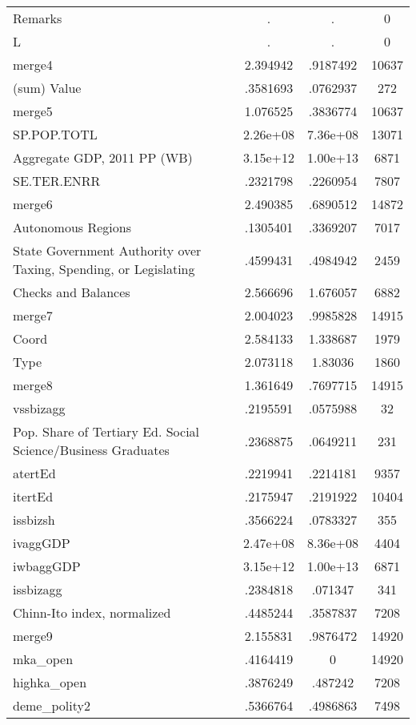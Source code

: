 {\begin{tabular}{l*{1}{ccc}}
Remarks             &           .&           .&           0\\
L                   &           .&           .&           0\\
merge4              &    2.394942&    .9187492&       10637\\
(sum) Value         &    .3581693&    .0762937&         272\\
merge5              &    1.076525&    .3836774&       10637\\
SP.POP.TOTL         &    2.26e+08&    7.36e+08&       13071\\
Aggregate GDP, 2011 PP (WB)&    3.15e+12&    1.00e+13&        6871\\
SE.TER.ENRR         &    .2321798&    .2260954&        7807\\
merge6              &    2.490385&    .6890512&       14872\\
Autonomous Regions  &    .1305401&    .3369207&        7017\\
State Government Authority over Taxing, Spending, or Legislating&    .4599431&    .4984942&        2459\\
Checks and Balances &    2.566696&    1.676057&        6882\\
merge7              &    2.004023&    .9985828&       14915\\
Coord               &    2.584133&    1.338687&        1979\\
Type                &    2.073118&     1.83036&        1860\\
merge8              &    1.361649&    .7697715&       14915\\
vssbizagg           &    .2195591&    .0575988&          32\\
Pop. Share of Tertiary Ed. Social Science/Business Graduates&    .2368875&    .0649211&         231\\
atertEd             &    .2219941&    .2214181&        9357\\
itertEd             &    .2175947&    .2191922&       10404\\
issbizsh            &    .3566224&    .0783327&         355\\
ivaggGDP            &    2.47e+08&    8.36e+08&        4404\\
iwbaggGDP           &    3.15e+12&    1.00e+13&        6871\\
issbizagg           &    .2384818&     .071347&         341\\
Chinn-Ito index, normalized&    .4485244&    .3587837&        7208\\
merge9              &    2.155831&    .9876472&       14920\\
mka\_open            &    .4164419&           0&       14920\\
highka\_open         &    .3876249&     .487242&        7208\\
deme\_polity2        &    .5366764&    .4986863&        7498\\
\hline\hline
\end{tabular}
}
